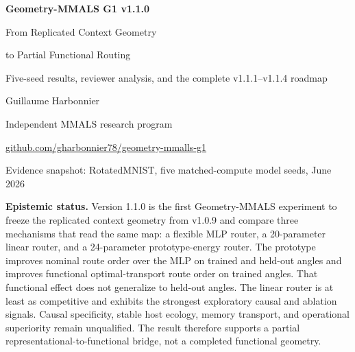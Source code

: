 \documentclass[11pt,a4paper]{article}
\begin{document}
\begin{titlepage}
\centering
\vspace*{0.6cm}
{\Huge\bfseries\color{deepblue} Geometry-MMALS G1 v1.1.0\par}
\vspace{0.25cm}
{\LARGE From Replicated Context Geometry\par}
\vspace{0.1cm}
{\LARGE to Partial Functional Routing\par}
\vspace{0.4cm}
{\Large Five-seed results, reviewer analysis, and the complete v1.1.1--v1.1.4 roadmap\par}
\vspace{0.7cm}
{\Large Guillaume Harbonnier\par}
\vspace{0.15cm}
{\normalsize Independent MMALS research program\par}
\vspace{0.15cm}
{\normalsize \href{https://github.com/gharbonnier78/geometry-mmalls-g1}{github.com/gharbonnier78/geometry-mmalls-g1}\par}
\vspace{0.55cm}
{\normalsize Evidence snapshot: RotatedMNIST, five matched-compute model seeds, June 2026\par}
\vfill
\begin{minipage}{0.94\textwidth}\small
\textbf{Epistemic status.} Version 1.1.0 is the first Geometry-MMALS experiment to freeze the replicated context geometry from v1.0.9 and compare three mechanisms that read the same map: a flexible MLP router, a 20-parameter linear router, and a 24-parameter prototype-energy router. The prototype improves nominal route order over the MLP on trained and held-out angles and improves functional optimal-transport route order on trained angles. That functional effect does not generalize to held-out angles. The linear router is at least as competitive and exhibits the strongest exploratory causal and ablation signals. Causal specificity, stable host ecology, memory transport, and operational superiority remain unqualified. The result therefore supports a partial representational-to-functional bridge, not a completed functional geometry.
\end{minipage}
\vfill
\end{titlepage}
\end{document}
